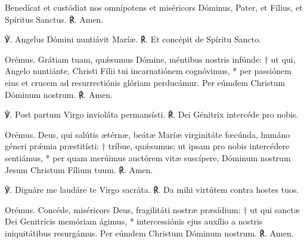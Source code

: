 \benedicamusDomino


Benedícat et custódiat nos
omnípotens et miséricors Dóminus,
Pater, et Fílius, et Spíritus Sanctus.
℟. Amen.

\label{antiphonaefinales}





℣. Angelus Dómini nuntiávit Maríæ.
℟. Et concépit de Spíritu Sancto.

Orémus.
Grátiam tuam, quǽsumus Dómine, méntibus nostris infúnde: †
ut qui, Angelo nuntiánte, Christi Fílii tui incarnatiónem cognóvimus, *
per passiónem eius et crucem ad resurrectiónis glóriam perducámur.
Per eúmdem Christum Dóminum nostrum. 
℟. Amen.


℣. Post partum Virgo invioláta permansísti.
℟. Dei Génitrix intercéde pro nobis.

Orémus.
Deus, qui salútis ætérnæ, 
beátæ Maríæ virginitáte fœcúnda,
humáno géneri prǽmia præstitísti: †
tríbue, quǽsumus; ut ipsam pro nobis intercédere sentiámus, *
per quam merúimus auctórem vitæ suscípere,
Dóminum nostrum Jesum Christum Fílium tuum.
℟. Amen.



℣. Dignáre me laudáre te Virgo sacráta.
℟. Da mihi virtútem contra hostes tuos.

Orémus.
Concéde, miséricors Deus, fragilitáti nostræ præsídium: †
ut qui sanctæ Dei Genitrícis memóriam ágimus, *
intercessiónis ejus auxílio a nostris iniquitátibus resurgámus.
Per eúmdem Christum Dóminum nostrum.
℟. Amen. 

